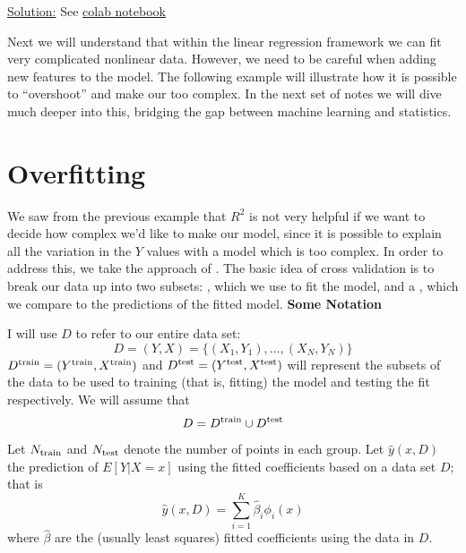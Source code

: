 \begin{example}

\noindent
\underline{Solution:} See \href{https://colab.research.google.com/drive/1q3mfX4od6iLFHy2dYFaKzw6FjaTbAaD3?usp=sharing}{colab notebook}


\end{example}

Next we will  understand that within the linear regression framework we can fit very complicated nonlinear data. However, we need to be careful when adding new features to the model. The following example will illustrate how it is possible to ``overshoot'' and make our too complex. In the next set of notes we will dive much deeper into this, bridging the gap between machine learning and statistics. 


\section{Overfitting}

We saw from the previous example that $R^2$ is not very helpful if we want to decide how complex we'd like to make our model, since it is possible to explain all the variation in the $Y$ values with a model which is too complex. In order to address this, we take the approach of . The basic idea of cross validation is to break our data up into two subsets: , which we use to fit the model, and a , which we compare to the predictions of the fitted model. 
 {\bf Some Notation}

 I will use $D$ to refer to our entire data set:
\begin{equation*}
D = (Y,X) = \{(X_1,Y_1),\dots,(X_N,Y_N)\}
\end{equation*}
 $D^{\rm train} = (Y^{\rm train},X^{\rm train})$ and $D^{\rm test} = (Y^{\rm test},X^{\rm test})$ will represent the subsets of the data to be used to training (that is, fitting) the model and testing the fit respectively.  We will assume that
\begin{equation*}
D = D^{\rm train} \cup D^{\rm test}
\end{equation*}
 Let $N_{\rm train}$ and $N_{\rm test}$ denote the number of points in each group.
 Let $\hat{y}(x,D)$ the prediction of $E[Y|X =x]$ using the fitted coefficients based on a data set $D$; that is
\begin{equation*}
\hat{y}(x,D) = \sum_{i=1}^{K}\hat{\beta}_i\phi_i(x)
\end{equation*} 
where $\hat{\beta}$ are the (usually least squares) fitted coefficients using the data in $D$. 




